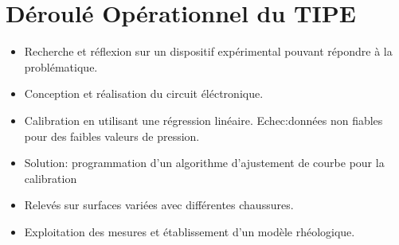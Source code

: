 \documentclass[11pt]{article}
\begin{document}
\section{Déroulé Opérationnel du TIPE}
\label{sec:org938c157}
\begin{itemize}
\item Recherche et réflexion sur un dispositif expérimental pouvant répondre à la problématique.\\\empty
\item Conception et réalisation du circuit éléctronique.\\\empty
\item Calibration en utilisant une régression linéaire. Echec:données non fiables pour des faibles valeurs de pression.\\\empty
\item Solution: programmation d'un algorithme d'ajustement de courbe pour la calibration\\\empty
\item Relevés sur surfaces variées avec différentes chaussures.\\\empty
\item Exploitation des mesures et établissement d'un modèle rhéologique.\\\empty
\end{itemize}
\end{document}
